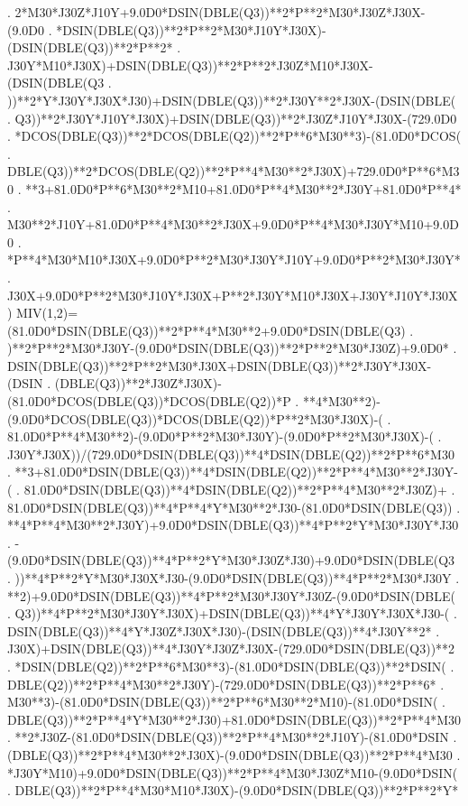 \begin{framedverbatim}
     . 2*M30*J30Z*J10Y+9.0D0*DSIN(DBLE(Q3))**2*P**2*M30*J30Z*J30X-(9.0D0
     . *DSIN(DBLE(Q3))**2*P**2*M30*J10Y*J30X)-(DSIN(DBLE(Q3))**2*P**2*
     . J30Y*M10*J30X)+DSIN(DBLE(Q3))**2*P**2*J30Z*M10*J30X-(DSIN(DBLE(Q3
     . ))**2*Y*J30Y*J30X*J30)+DSIN(DBLE(Q3))**2*J30Y**2*J30X-(DSIN(DBLE(
     . Q3))**2*J30Y*J10Y*J30X)+DSIN(DBLE(Q3))**2*J30Z*J10Y*J30X-(729.0D0
     . *DCOS(DBLE(Q3))**2*DCOS(DBLE(Q2))**2*P**6*M30**3)-(81.0D0*DCOS(
     . DBLE(Q3))**2*DCOS(DBLE(Q2))**2*P**4*M30**2*J30X)+729.0D0*P**6*M30
     . **3+81.0D0*P**6*M30**2*M10+81.0D0*P**4*M30**2*J30Y+81.0D0*P**4*
     . M30**2*J10Y+81.0D0*P**4*M30**2*J30X+9.0D0*P**4*M30*J30Y*M10+9.0D0
     . *P**4*M30*M10*J30X+9.0D0*P**2*M30*J30Y*J10Y+9.0D0*P**2*M30*J30Y*
     . J30X+9.0D0*P**2*M30*J10Y*J30X+P**2*J30Y*M10*J30X+J30Y*J10Y*J30X)
      MIV(1,2)=(81.0D0*DSIN(DBLE(Q3))**2*P**4*M30**2+9.0D0*DSIN(DBLE(Q3)
     . )**2*P**2*M30*J30Y-(9.0D0*DSIN(DBLE(Q3))**2*P**2*M30*J30Z)+9.0D0*
     . DSIN(DBLE(Q3))**2*P**2*M30*J30X+DSIN(DBLE(Q3))**2*J30Y*J30X-(DSIN
     . (DBLE(Q3))**2*J30Z*J30X)-(81.0D0*DCOS(DBLE(Q3))*DCOS(DBLE(Q2))*P
     . **4*M30**2)-(9.0D0*DCOS(DBLE(Q3))*DCOS(DBLE(Q2))*P**2*M30*J30X)-(
     . 81.0D0*P**4*M30**2)-(9.0D0*P**2*M30*J30Y)-(9.0D0*P**2*M30*J30X)-(
     . J30Y*J30X))/(729.0D0*DSIN(DBLE(Q3))**4*DSIN(DBLE(Q2))**2*P**6*M30
     . **3+81.0D0*DSIN(DBLE(Q3))**4*DSIN(DBLE(Q2))**2*P**4*M30**2*J30Y-(
     . 81.0D0*DSIN(DBLE(Q3))**4*DSIN(DBLE(Q2))**2*P**4*M30**2*J30Z)+
     . 81.0D0*DSIN(DBLE(Q3))**4*P**4*Y*M30**2*J30-(81.0D0*DSIN(DBLE(Q3))
     . **4*P**4*M30**2*J30Y)+9.0D0*DSIN(DBLE(Q3))**4*P**2*Y*M30*J30Y*J30
     . -(9.0D0*DSIN(DBLE(Q3))**4*P**2*Y*M30*J30Z*J30)+9.0D0*DSIN(DBLE(Q3
     . ))**4*P**2*Y*M30*J30X*J30-(9.0D0*DSIN(DBLE(Q3))**4*P**2*M30*J30Y
     . **2)+9.0D0*DSIN(DBLE(Q3))**4*P**2*M30*J30Y*J30Z-(9.0D0*DSIN(DBLE(
     . Q3))**4*P**2*M30*J30Y*J30X)+DSIN(DBLE(Q3))**4*Y*J30Y*J30X*J30-(
     . DSIN(DBLE(Q3))**4*Y*J30Z*J30X*J30)-(DSIN(DBLE(Q3))**4*J30Y**2*
     . J30X)+DSIN(DBLE(Q3))**4*J30Y*J30Z*J30X-(729.0D0*DSIN(DBLE(Q3))**2
     . *DSIN(DBLE(Q2))**2*P**6*M30**3)-(81.0D0*DSIN(DBLE(Q3))**2*DSIN(
     . DBLE(Q2))**2*P**4*M30**2*J30Y)-(729.0D0*DSIN(DBLE(Q3))**2*P**6*
     . M30**3)-(81.0D0*DSIN(DBLE(Q3))**2*P**6*M30**2*M10)-(81.0D0*DSIN(
     . DBLE(Q3))**2*P**4*Y*M30**2*J30)+81.0D0*DSIN(DBLE(Q3))**2*P**4*M30
     . **2*J30Z-(81.0D0*DSIN(DBLE(Q3))**2*P**4*M30**2*J10Y)-(81.0D0*DSIN
     . (DBLE(Q3))**2*P**4*M30**2*J30X)-(9.0D0*DSIN(DBLE(Q3))**2*P**4*M30
     . *J30Y*M10)+9.0D0*DSIN(DBLE(Q3))**2*P**4*M30*J30Z*M10-(9.0D0*DSIN(
     . DBLE(Q3))**2*P**4*M30*M10*J30X)-(9.0D0*DSIN(DBLE(Q3))**2*P**2*Y*

\end{framedverbatim}
